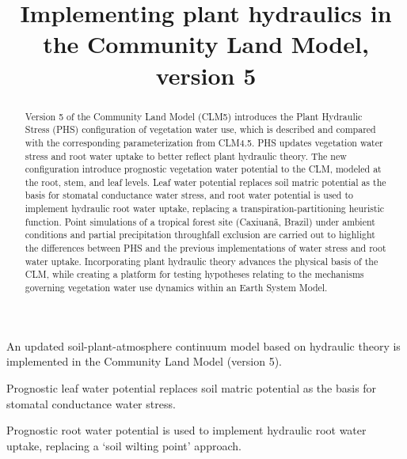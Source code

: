 \documentclass[draft,linenumbers]{agujournal}
\begin{document}
\title{Implementing plant hydraulics in the Community Land Model, version 5}



\begin{keypoints}
\item An updated soil-plant-atmosphere continuum model based on hydraulic theory is implemented in the Community Land Model (version 5).
\item Prognostic leaf water potential replaces soil matric potential as the basis for stomatal conductance water stress. 
\item Prognostic root water potential is used to implement hydraulic root water uptake, replacing a `soil wilting point' approach.
\end{keypoints}



\begin{abstract}
Version 5 of the Community Land Model (CLM5) introduces the Plant Hydraulic Stress (PHS) configuration of vegetation water use, which is described and compared with the corresponding parameterization from CLM4.5.
PHS updates vegetation water stress and root water uptake to better reflect plant hydraulic theory.
The new configuration introduce prognostic vegetation water potential to the CLM, modeled at the root, stem, and leaf levels.
Leaf water potential replaces soil matric potential as the basis for stomatal conductance water stress, and
root water potential is used to implement hydraulic root water uptake, replacing a transpiration-partitioning heuristic function.
Point simulations of a tropical forest site (Caxiuan\~a, Brazil) under ambient conditions and partial precipitation throughfall exclusion are carried out to highlight the differences between PHS and the previous implementations of water stress and root water uptake.
Incorporating plant hydraulic theory advances the physical basis of the CLM, while creating a platform for testing hypotheses relating to the mechanisms governing vegetation water use dynamics within an Earth System Model.
\end{abstract}

\end{document}
